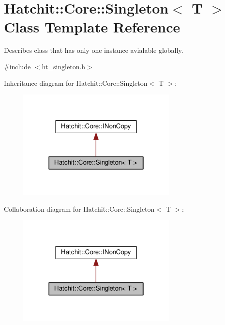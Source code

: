 \hypertarget{classHatchit_1_1Core_1_1Singleton}{}\section{Hatchit\+:\+:Core\+:\+:Singleton$<$ T $>$ Class Template Reference}
\label{classHatchit_1_1Core_1_1Singleton}


Describes class that has only one instance avialable globally.  




{\ttfamily \#include $<$ht\+\_\+singleton.\+h$>$}



Inheritance diagram for Hatchit\+:\+:Core\+:\+:Singleton$<$ T $>$\+:
\nopagebreak
\begin{figure}[H]
\begin{center}
\leavevmode
\includegraphics[width=226pt]{classHatchit_1_1Core_1_1Singleton__inherit__graph}
\end{center}
\end{figure}


Collaboration diagram for Hatchit\+:\+:Core\+:\+:Singleton$<$ T $>$\+:
\nopagebreak
\begin{figure}[H]
\begin{center}
\leavevmode
\includegraphics[width=226pt]{classHatchit_1_1Core_1_1Singleton__coll__graph}
\end{center}
\end{figure}
